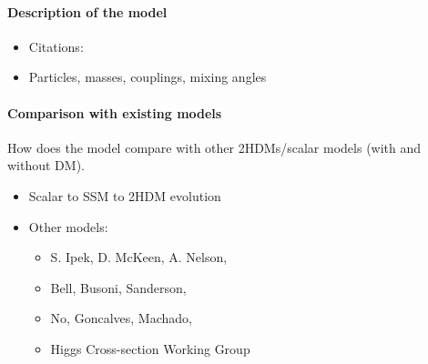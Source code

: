 \paragraph{Description of the model}

\begin{itemize}

\item Citations: \cite{Bauer:2017ota, Bell:2016ekl, Ipek:2014gua, No:2015xqa, Goncalves:2016iyg}

\item Particles, masses, couplings, mixing angles

\end{itemize}

\paragraph{Comparison with existing models}

How does the model compare with other 2HDMs/scalar models (with and without DM). 

\begin{itemize}
    \item Scalar to SSM to 2HDM evolution
    \item Other models:
    \begin{itemize}
        \item S. Ipek, D. McKeen, A. Nelson, \cite{Ipek:2014gua}
        \item Bell, Busoni, Sanderson, \cite{Bell:2016ekl}
        \item No, Goncalves, Machado, \cite{No:2015xqa, Goncalves:2016iyg}
        \item Higgs Cross-section Working Group
    \end{itemize}
\end{itemize}




